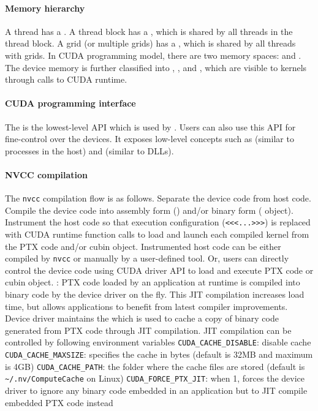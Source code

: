 \documentclass{myart}
\begin{document}
\paragraph{Memory hierarchy}
\bit
\w A thread has a .
\w A thread block has a , which is shared by all
threads in the thread block.
\w A grid (or multiple grids) has a , which is shared by all
threads with grids.
\w In CUDA programming model, there are two memory spaces: 
and . The device memory is further classified into
, , and , which are
visible to kernels through calls to CUDA runtime.
\eit

\paragraph{CUDA programming interface}
\bit
\w The   is the lowest-level  API which is used by . Users can also use this API for fine-control over the devices.
  It exposes low-level concepts such as  (similar to
  processes in the host) and  (similar to DLLs). 
\eit

\paragraph{NVCC compilation}
\bit
\w The \verb+nvcc+ compilation flow is as follows.
   \ben
   \w Separate the device code from host code.
   \w Compile the device code into assembly form () and/or binary
   form ( object). 
   \w Instrument the host code so that execution configuration
   (\verb+<<<...>>>+) is replaced with CUDA runtime function calls to load and
   launch each compiled kernel from the PTX code and/or cubin object.
   \een
\w Instrumented host code can be either compiled by \verb+nvcc+ or manually by
a user-defined tool. Or, users can directly control the device code using CUDA
driver API to load and execute PTX code or cubin object.
\w {}: PTX code loaded by an application at runtime is
compiled into binary code by the device driver on the fly. This JIT
compilation increases load time, but allows applications to benefit from
latest compiler improvements. 
\w Device driver maintains the  which is used to cache a
copy of binary code generated from PTX code through JIT compilation. JIT
compilation can be controlled by following environment variables
  \bit
  \w \verb+CUDA_CACHE_DISABLE+: disable cache
  \w \verb+CUDA_CACHE_MAXSIZE+: specifies the cache in bytes (default is 32MB
  and maximum is 4GB)
  \w \verb+CUDA_CACHE_PATH+: the folder where the cache files are stored
  (default is \verb+~/.nv/ComputeCache+ on Linux)
  \w \verb+CUDA_FORCE_PTX_JIT+: when 1, forces the device driver to ignore any
  binary code embedded in an application but to JIT compile embedded PTX code
  instead 
  \eit
\eit
\end{document}
